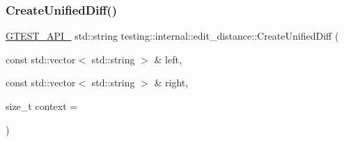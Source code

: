 \subsubsection{\texorpdfstring{CreateUnifiedDiff()}{CreateUnifiedDiff()}}
{\footnotesize\ttfamily \mbox{\hyperlink{gtest-port_8h_aa73be6f0ba4a7456180a94904ce17790}{G\+T\+E\+S\+T\+\_\+\+A\+P\+I\+\_\+}} std\+::string testing\+::internal\+::edit\+\_\+distance\+::\+Create\+Unified\+Diff (\begin{DoxyParamCaption}\item[{const std\+::vector$<$ std\+::string $>$ \&}]{left,  }\item[{const std\+::vector$<$ std\+::string $>$ \&}]{right,  }\item[{size\+\_\+t}]{context = {} }\end{DoxyParamCaption})}


